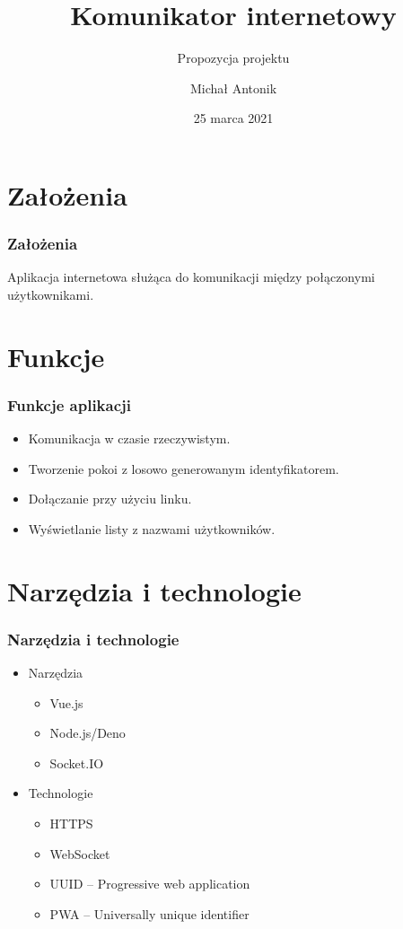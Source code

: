 \documentclass[aspectratio=169]{beamer}
\title{Komunikator internetowy}
\subtitle{Propozycja projektu}
\author{Michał Antonik}
\date{25 marca 2021}
\begin{document}
\maketitle
\section{Założenia}
\begin{frame}
  \frametitle{Założenia}
  Aplikacja internetowa służąca do komunikacji między połączonymi użytkownikami.
\end{frame}
\section{Funkcje}
\begin{frame}
  \frametitle{Funkcje aplikacji}
  \begin{itemize}
    \item Komunikacja w czasie rzeczywistym.
    \item Tworzenie pokoi z losowo generowanym identyfikatorem.
    \item Dołączanie przy użyciu linku.
    \item Wyświetlanie listy z nazwami użytkowników.
  \end{itemize}
\end{frame}
\section{Narzędzia i technologie}
\begin{frame}
  \frametitle{Narzędzia i technologie}
  \begin{itemize}
    \item Narzędzia
    \begin{itemize}
      \item Vue.js
      \item Node.js/Deno
      \item Socket.IO
    \end{itemize}
    \item Technologie
    \begin{itemize}
      \item HTTPS
      \item WebSocket
      \item UUID -- Progressive web application
      \item PWA -- Universally unique identifier
    \end{itemize}
  \end{itemize}
\end{frame}
\end{document}
